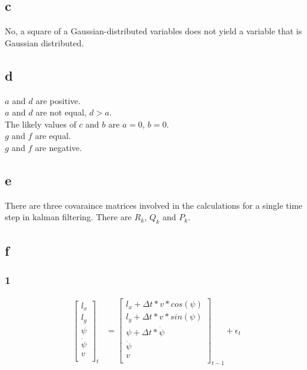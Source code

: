 \documentclass[12pt]{article}
\begin{document}
\subsection{c}
No, a square of a Gaussian-distributed variables does not yield a variable that is Gaussian distributed.
\subsection{d}
$a$ and $d$ are positive.\\
$a$ and $d$ are not equal, $d>a$.\\
The likely values of $c$ and $b$ are $a=0$, $b=0$.\\
$g$ and $f$ are equal.\\
$g$ and $f$ are negative.\\

\subsection{e}
There are three covaraince matrices involved in the calculations for a single time step in kalman filtering.
There are $R_k$, $Q_k$ and $P_k$.
\subsection{f}
\subsubsection{1}
\begin{align*}
    \begin{bmatrix}
        l_x      \\
        l_y      \\
        \psi     \\
        \dot\psi \\
        v        \\
    \end{bmatrix}_t & = \begin{bmatrix}
        l_x +  \Delta{t} * v * cos(\psi) \\
        l_y + \Delta{t}*v*sin(\psi)      \\
        \psi + \Delta{t} * \dot\psi      \\
        \dot\psi                         \\
        v                                \\
    \end{bmatrix}_{t-1}
    +
    \epsilon_t
\end{align*}
\end{document}
